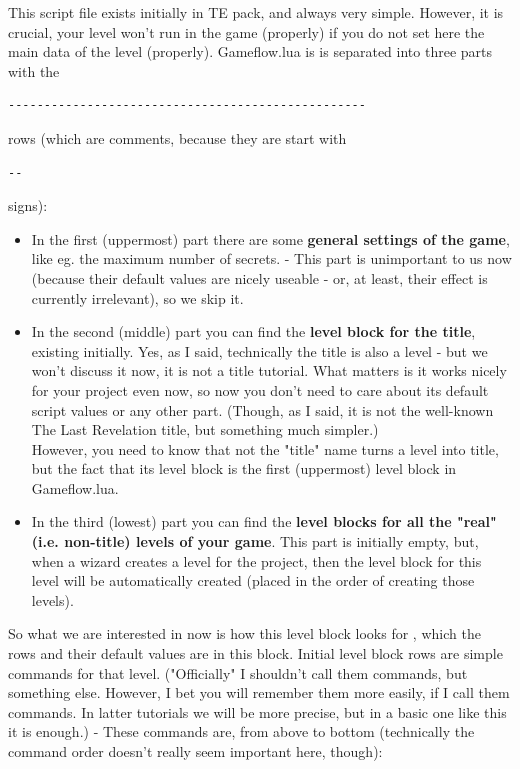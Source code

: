 This script file exists initially in TE pack, and always very simple. However, it is crucial, your level won't run in the game (properly) if you do not set here the main data of the level (properly).
Gameflow.lua is is separated into three parts with the 
\begin{lstlisting}[style=lua]
--------------------------------------------------
\end{lstlisting}
 rows (which are comments, because they are start with 
\begin{lstlisting}[style=lua]
--
\end{lstlisting}
signs):
\begin{itemize}
    \item In the first (uppermost) part there are some \textbf{general settings of the game}, like eg. the maximum number of secrets. - This part is unimportant to us now (because their default values are nicely useable - or, at least, their effect is currently irrelevant), so we skip it.
    \item In the second (middle) part you can find the \textbf{level block for the title}, existing initially. Yes, as I said, technically the title is also a level - but we won't discuss it now, it is not a title tutorial. What matters is it works nicely for your project even now, so now you don't need to care about its default script values or any other part. (Though, as I said, it is not the well-known The Last Revelation title, but something much simpler.) \\ However, you need to know that not the "title" name turns a level into title, but the fact that its level block is the first (uppermost) level block in Gameflow.lua.
    \item In the third (lowest) part you can find the \textbf{level blocks for all the "real" (i.e. non-title) levels of your game}. This part is initially empty, but, when a wizard creates a level for the project, then the level block for this level will be automatically created (placed in the order of creating those levels).
\end{itemize}

So what we are interested in now is how this level block looks for , which the rows and their default values are in this block.
Initial level block rows are simple commands for that level. ("Officially" I shouldn't call them commands, but something else. However, I bet you will remember them more easily, if I call them commands. In latter tutorials we will be more precise, but in a basic one like this it is enough.) - These commands are, from above to bottom (technically the command order doesn't really seem important here, though):

